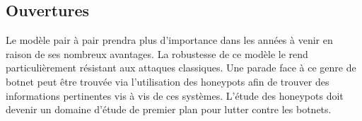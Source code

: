 \subsection{Ouvertures}

Le modèle pair à pair prendra plus d'importance dans les années à venir en
raison de ses nombreux avantages. La robustesse de ce modèle le rend
particulièrement résistant aux attaques classiques. Une parade face à ce genre
de botnet peut être trouvée via l'utilisation des honeypots afin de trouver des
informations pertinentes vis à vis de ces systèmes. L'étude des honeypots doit
devenir un domaine d'étude de premier plan pour lutter contre les botnets.

